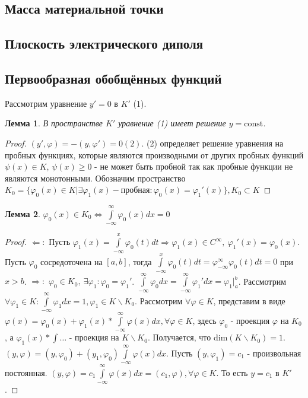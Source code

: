 \documentclass[9pt, a4paper]{article}
\newtheorem*{lemma}{Лемма}
\begin{document}
		\subsection{Масса материальной точки}
		\subsection{Плоскость электрического диполя}
		\subsection{Первообразная обобщённых функций}
			Рассмотрим уравнение $y' = 0$ в $K'$ (1).
			\begin{lemma}
				В пространстве $K'$ уравнение (1) имеет решение $y = \mathrm{const}$.
			\end{lemma}
			\begin{proof}
				$(y', \varphi) = -(y, \varphi') =0 (2)$. (2) определяет решение уравнения на пробных функциях, которые являются производными от других пробных функций $\psi(x) \in K$, $\psi(x) \geq 0$ - не может быть пробной так как пробные функции не являются монотонными. Обозначим пространство $K_0 = \{\varphi_0(x) \in K \vert \exists \varphi_1(x) - \text{пробная}: \varphi_0(x) = \varphi_1'(x)\}, K_0\subset K$
			\end{proof}
			\begin{lemma}
				$\varphi_0(x) \in K_0 \Leftrightarrow \int\limits_{-\infty}^{\infty} \varphi_0(x) dx = 0$
			\end{lemma}
			\begin{proof}
				$\Leftarrow:$ Пусть $\varphi_1(x) = \int\limits_{-\infty}^{x}\varphi_0(t) dt \Rightarrow \varphi_1(x) \in C^\infty, \ \varphi_1'(x) = \varphi_0(x)$. Пусть $\varphi_0$ сосредоточена на $[a,b]$, тогда $\int\limits_{-\infty}^{x}\varphi_0(t) dt = \varphi_{-\infty}^{\infty} \varphi_0(t)dt  = 0$ при $x > b$. \newline
				$\Rightarrow:$ $\varphi_0 \in K_0, \ \exists \varphi_1: \varphi_0 = \varphi_1'$. $\int\limits_{-\infty}^{\infty} \varphi_0 dx = \int\limits_{-\infty}^{\infty} \varphi_1' dx = \varphi_1 \vert_a^b$. Рассмотрим $\forall \varphi_1 \in K: \int\limits_{-\infty}^{\infty} \varphi_1 dx =1, \varphi_1 \in K \backslash K_0$. Рассмотрим $\forall \varphi \in K$, представим в виде $\varphi(x) = \varphi_0(x) + \varphi_1(x) * \int\limits_{-\infty}^{\infty} \varphi(x) dx, \forall \varphi \in K$, здесь $\varphi_0$ - проекция $\varphi$ на $K_0$, а $\varphi_1(x) * \int\dots$ - проекция на $K \backslash K_0$. Получается, что $\mathrm{dim} (K \backslash K_0) = 1$.\newline
				$(y, \varphi) = (y, \varphi_0) + (y_1, \varphi_0)\int\limits_{-\infty}^{\infty} \varphi(x) dx$. Пусть $(y, \varphi_1) = c_1$ - произвольная постоянная. $(y, \varphi) = c_1 \int\limits_{-\infty}^{\infty} \varphi(x) dx = (c_1, \varphi), \forall \varphi \in K$. То есть $y = c_1$ в $K'$. 
			\end{proof}
\end{document}

